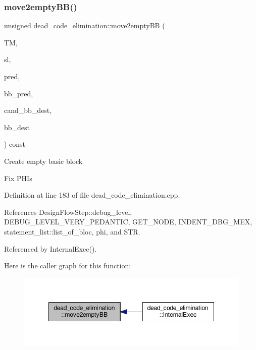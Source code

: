 \subsubsection{\texorpdfstring{move2empty\+B\+B()}{move2emptyBB()}}
{\footnotesize\ttfamily unsigned dead\+\_\+code\+\_\+elimination\+::move2empty\+BB (\begin{DoxyParamCaption}\item[{const \hyperlink{tree__manager_8hpp_a96ff150c071ce11a9a7a1e40590f205e}{tree\+\_\+manager\+Ref}}]{TM,  }\item[{\hyperlink{structstatement__list}{statement\+\_\+list} $\ast$}]{sl,  }\item[{unsigned}]{pred,  }\item[{bloc\+Ref}]{bb\+\_\+pred,  }\item[{unsigned}]{cand\+\_\+bb\+\_\+dest,  }\item[{unsigned}]{bb\+\_\+dest }\end{DoxyParamCaption}) const\hspace{0.3cm}{\ttfamily [private]}}

Create empty basic block

Fix P\+H\+Is 

Definition at line 183 of file dead\+\_\+code\+\_\+elimination.\+cpp.



References Design\+Flow\+Step\+::debug\+\_\+level, D\+E\+B\+U\+G\+\_\+\+L\+E\+V\+E\+L\+\_\+\+V\+E\+R\+Y\+\_\+\+P\+E\+D\+A\+N\+T\+IC, G\+E\+T\+\_\+\+N\+O\+DE, I\+N\+D\+E\+N\+T\+\_\+\+D\+B\+G\+\_\+\+M\+EX, statement\+\_\+list\+::list\+\_\+of\+\_\+bloc, phi, and S\+TR.



Referenced by Internal\+Exec().

Here is the caller graph for this function\+:
\nopagebreak
\begin{figure}[H]
\begin{center}
\leavevmode
\includegraphics[width=348pt]{d5/d8b/classdead__code__elimination_a195659a171fca995cfd7a6f59017c37d_icgraph}
\end{center}
\end{figure}


